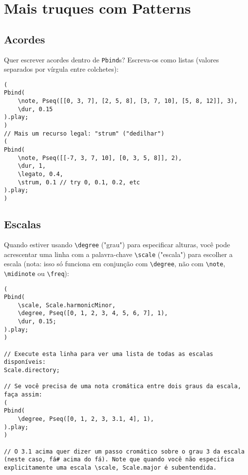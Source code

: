 \section{Mais truques com Patterns}

\subsection{Acordes}

Quer escrever acordes dentro de \texttt{Pbind}s? Escreva-os como listas (valores separados por vírgula entre colchetes):
 
\begin{lstlisting}[style=SuperCollider-IDE, basicstyle=\scttfamily\footnotesize]
(
Pbind(
	\note, Pseq([[0, 3, 7], [2, 5, 8], [3, 7, 10], [5, 8, 12]], 3),
	\dur, 0.15
).play;
)
// Mais um recurso legal: "strum" ("dedilhar")
(
Pbind(
	\note, Pseq([[-7, 3, 7, 10], [0, 3, 5, 8]], 2),
	\dur, 1,
	\legato, 0.4,
	\strum, 0.1 // try 0, 0.1, 0.2, etc
).play;
)
\end{lstlisting}
 

\subsection{Escalas}

Quando estiver usando \texttt{\textbackslash degree} ("grau") para especificar alturas, você pode acrescentar uma linha com a palavra-chave \texttt{\textbackslash scale} ("escala") para escolher a escala (nota: isso só funciona em conjunção com \texttt{\textbackslash degree}, não com \texttt{\textbackslash note}, \texttt{\textbackslash midinote} ou \texttt{\textbackslash freq}):

 
\begin{lstlisting}[style=SuperCollider-IDE, basicstyle=\scttfamily\footnotesize]
(
Pbind(
	\scale, Scale.harmonicMinor,
	\degree, Pseq([0, 1, 2, 3, 4, 5, 6, 7], 1),
	\dur, 0.15;
).play;
)

// Execute esta linha para ver uma lista de todas as escalas disponíveis:
Scale.directory;

// Se você precisa de uma nota cromática entre dois graus da escala, faça assim:
(
Pbind(
	\degree, Pseq([0, 1, 2, 3, 3.1, 4], 1),
).play;
)

// O 3.1 acima quer dizer um passo cromático sobre o grau 3 da escala (neste caso, fá# acima do fá). Note que quando você não especifica explicitamente uma escala \scale, Scale.major é subentendida.
\end{lstlisting}

